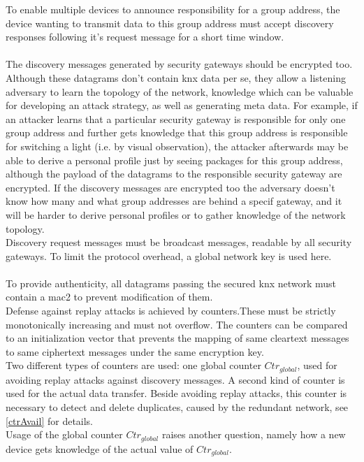 To enable multiple devices to announce responsibility for a group address, the device wanting to transmit data to this group address must accept discovery responses
following it's request message for a short time window.
\\
\\
The discovery messages generated by security gateways should be encrypted too. Although these datagrams don't contain \gls{knx} data per se, they allow
a listening adversary to learn the topology of the network, knowledge which can be valuable for developing an attack strategy, as well as generating meta data.
For example, if an attacker learns that a particular security gateway is responsible for only one group address and further gets knowledge that this 
group address is responsible for switching a light (i.e. by visual observation), the attacker afterwards may be able to derive a personal profile just by seeing
packages for this group address, although the payload of the datagrams to the responsible security gateway are encrypted.
If the discovery messages are encrypted too the adversary doesn't know how many and what
group addresses are behind a specif gateway, and it will be harder to derive personal profiles or to gather knowledge of the network topology.
\\
Discovery request messages must be broadcast messages, readable by all security gateways. To limit the protocol overhead, a global network key is used here.
\\
\\
To provide authenticity, all datagrams passing the secured \gls{knx} network must contain a \gls{mac2} to prevent modification of them.
\\
Defense against replay attacks is achieved by counters.These must be strictly monotonically
increasing and must not overflow. The counters can be compared to an initialization vector that prevents the mapping of same cleartext messages to same ciphertext messages
under the same encryption key.
\\
Two different types of counters are used: one global counter $Ctr_{global}$, used for avoiding replay attacks against discovery messages. A second kind of counter
is used for the actual data transfer. Beside avoiding replay attacks, this counter is necessary to detect and delete duplicates, caused by the redundant network, 
see \ref{ctrAvail} for details.
\\
Usage of the global counter $Ctr_{global}$ raises another question, namely how a new device gets knowledge of the actual value of $Ctr_{global}$.
